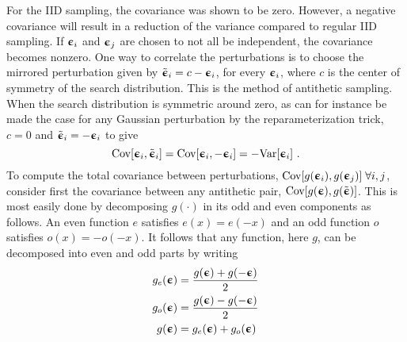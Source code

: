 For the \gls{IID} sampling, the covariance was shown to be zero. However, a negative covariance will result in a reduction of the variance compared to regular \gls{IID} sampling. If ${\boldsymbol{\upepsilon}}_i$ and ${\boldsymbol{\upepsilon}}_j$ are chosen to not all be independent, the covariance becomes nonzero.  
One way to correlate the perturbations is to choose the mirrored perturbation given by $\tilde{{\boldsymbol{\upepsilon}}}_i=c-{\boldsymbol{\upepsilon}}_i$, for every ${\boldsymbol{\upepsilon}}_i$, where $c$ is the center of symmetry of the search distribution. This is the method of antithetic sampling. 
When the search distribution is symmetric around zero, as can for instance be made the case for any Gaussian perturbation by the reparameterization trick, $c=0$ and $\tilde{{\boldsymbol{\upepsilon}}}_i=-{\boldsymbol{\upepsilon}}_i$ to give
\begin{equation}
    \text{Cov}{\left[{\boldsymbol{\upepsilon}}_i,\tilde{{\boldsymbol{\upepsilon}}}_i\right]} = \text{Cov}{\left[{\boldsymbol{\upepsilon}}_i,-{\boldsymbol{\upepsilon}}_i\right]} = -\text{Var}{\left[{\boldsymbol{\upepsilon}}_i\right]} \ .
\end{equation}
To compute the total covariance between perturbations, $\text{Cov}{\left[g({\boldsymbol{\upepsilon}}_i), g({\boldsymbol{\upepsilon}}_j)\right]}\;\forall i,j$, consider first the covariance between any antithetic pair, $\text{Cov}{\left[g({\boldsymbol{\upepsilon}}), g(\tilde{{\boldsymbol{\upepsilon}}})\right]}$. This is most easily done by decomposing $g(\cdot)$ in its odd and even components as follows. An even function $e$ satisfies $e(x)=e(-x)$ and an odd function $o$ satisfies $o(x)=-o(-x)$. It follows that any function, here $g$, can be decomposed into even and odd parts by writing
\begin{subequations}
    \begin{align}
        g_e({\boldsymbol{\upepsilon}}) &= \frac{g({\boldsymbol{\upepsilon}})+g(-{\boldsymbol{\upepsilon}})}{2}\label{eq: Theory: Antithetic sampling even and odd function decomposition definition a}\\
        g_o({\boldsymbol{\upepsilon}}) &= \frac{g({\boldsymbol{\upepsilon}})-g(-{\boldsymbol{\upepsilon}})}{2}\label{eq: Theory: Antithetic sampling even and odd function decomposition definition b}\\
        g({\boldsymbol{\upepsilon}}) &= g_e({\boldsymbol{\upepsilon}}) + g_o({\boldsymbol{\upepsilon}})\label{eq: Theory: Antithetic sampling even and odd function decomposition definition c}
    \end{align}
\end{subequations}
